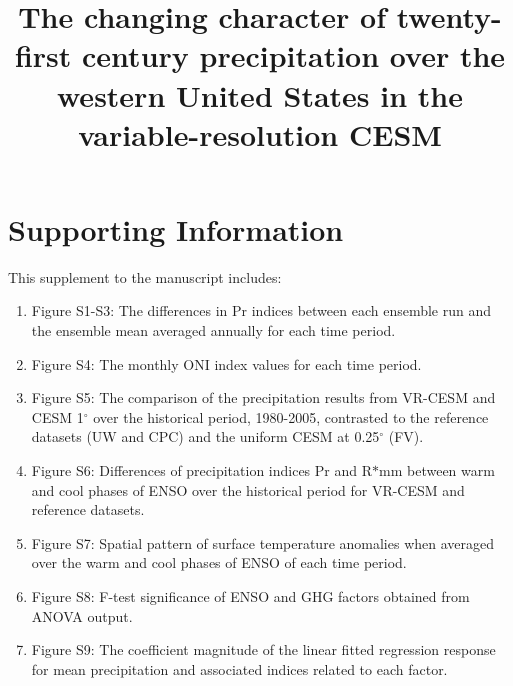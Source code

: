 \documentclass{ametsoc}
\title{The changing character of twenty-first century precipitation over the western United States in the variable-resolution CESM}
\affiliation{Department of Land, Air and Water Resources, University of California, Davis}
\begin{document}

\section{Supporting Information}

This supplement to the manuscript includes:

\begin{enumerate}

\item Figure S1-S3: The differences in Pr indices between each ensemble run and the ensemble mean averaged annually for each time period.

\item Figure S4: The monthly ONI index values for each time period.

\item Figure S5: The comparison of the precipitation results from VR-CESM and CESM 1$^\circ$ over the historical period, 1980-2005, contrasted to the reference datasets (UW and CPC) and the uniform CESM at 0.25$^\circ$ (FV).

\item Figure S6: Differences of precipitation indices Pr and R$\ast$mm between warm and cool phases of ENSO over the historical period for VR-CESM and reference datasets.

\item Figure S7: Spatial pattern of surface temperature anomalies when averaged over the warm and cool phases of ENSO of each time period.

\item Figure S8: F-test significance of ENSO and GHG factors obtained from ANOVA output.

\item Figure S9: The coefficient magnitude of the linear fitted regression response for mean precipitation and associated indices related to each factor.

\end{enumerate}

%

\end{document}
